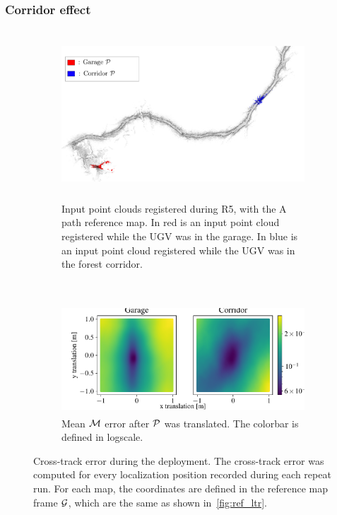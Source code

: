 \subsubsection{Corridor effect}
\label{sec:forest_canyon}

\lightlipsum[1]

\begin{figure}[htpb]
	\begin{center}
		\begin{subfigure}[b]{\textwidth}
			\centering
			\includegraphics[height=2.5in]{figs/forest_canyon/path_a_w_input_pcls.pdf}
			\caption{Input point clouds registered during R5, with the A path reference map.
			In red is an input point cloud registered while the \ac{UGV} was in the garage.
			In blue is an input point cloud registered while the \ac{UGV} was in the forest corridor.}
			\label{fig:forest_canyon_top}
		\end{subfigure}
		\\
		\begin{subfigure}[b]{\textwidth}
			\centering
			\includegraphics[height=1.6in]{figs/forest_canyon/forest_canyon.pdf}
			\caption{Mean $\mathcal{M}$ error after $\mathcal{P}$ was translated. 
				The colorbar is defined in logscale.}
			\label{fig:forest_canyon_bottom}
		\end{subfigure}
		\caption{Cross-track error during the deployment.
			The cross-track error was computed for every localization position recorded during each repeat run.
			For each map, the coordinates are defined in the reference map frame $\mathcal{G}$, which are the same as shown in~\autoref{fig:ref_ltr}.} 
		\label{fig:forest_canyon}
	\end{center}
\end{figure}

